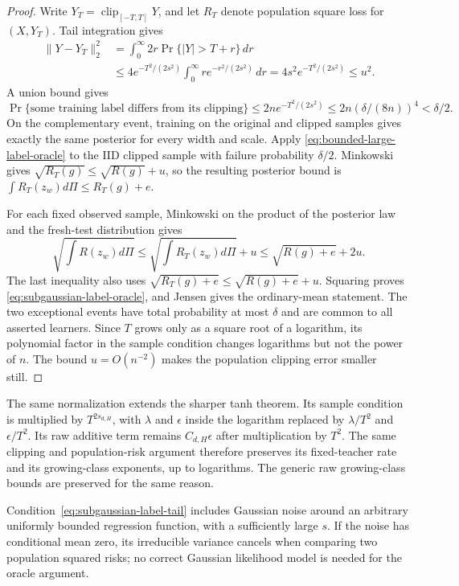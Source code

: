 \begin{proof}
Write $Y_T=\operatorname{clip}_{[-T,T]}Y$, and let $R_T$ denote
population square loss for $(X,Y_T)$. Tail integration gives
\begin{align*}
 \|Y-Y_T\|_2^2
 &=\int_0^\infty2r\Pr\{|Y|>T+r\}\,dr\\
 &\leq4e^{-T^2/(2s^2)}
       \int_0^\infty r e^{-r^2/(2s^2)}\,dr
 =4s^2e^{-T^2/(2s^2)}\leq u^2.
\end{align*}
A union bound gives
\[
 \Pr\{\text{some training label differs from its clipping}\}
 \leq2n e^{-T^2/(2s^2)}
 \leq2n(\delta/(8n))^4<\delta/2.
\]
On the complementary event, training on the original and clipped
samples gives exactly the same posterior for every width and scale.
Apply \eqref{eq:bounded-large-label-oracle} to the IID clipped sample
with failure probability $\delta/2$. Minkowski gives
$\sqrt{R_T(g)}\leq\sqrt{R(g)}+u$, so the resulting posterior bound is
$\int R_T(z_w)d\Pi\leq R_T(g)+e$.

For each fixed observed sample, Minkowski on the product of the
posterior law and the fresh-test distribution gives
\[
 \sqrt{\int R(z_w)d\Pi}
 \leq\sqrt{\int R_T(z_w)d\Pi}+u
 \leq\sqrt{R(g)+e}+2u.
\]
The last inequality also uses
$\sqrt{R_T(g)+e}\leq\sqrt{R(g)+e}+u$.
Squaring proves \eqref{eq:subgaussian-label-oracle}, and Jensen gives
the ordinary-mean statement. The two exceptional events have total
probability at most $\delta$ and are common to all asserted learners.
Since $T$ grows only as a square root of a logarithm, its polynomial
factor in the sample condition changes logarithms but not the power
of $n$. The bound $u=O(n^{-2})$ makes the population clipping error
smaller still.
\end{proof}

The same normalization extends the sharper tanh theorem. Its sample
condition is multiplied by $T^{2s_{d,H}}$, with $\lambda$ and
$\epsilon$ inside the logarithm replaced by $\lambda/T^2$ and
$\epsilon/T^2$. Its raw additive term remains $C_{d,H}\epsilon$ after
multiplication by $T^2$. The same clipping and population-risk argument
therefore preserves its fixed-teacher rate and its growing-class
exponents, up to logarithms. The generic raw growing-class bounds
are preserved for the same reason.

Condition~\eqref{eq:subgaussian-label-tail} includes Gaussian noise
around an arbitrary uniformly bounded regression function, with a
sufficiently large $s$. If the noise has conditional mean zero, its
irreducible variance cancels when comparing two population squared
risks; no correct Gaussian likelihood model is needed for the oracle
argument.
